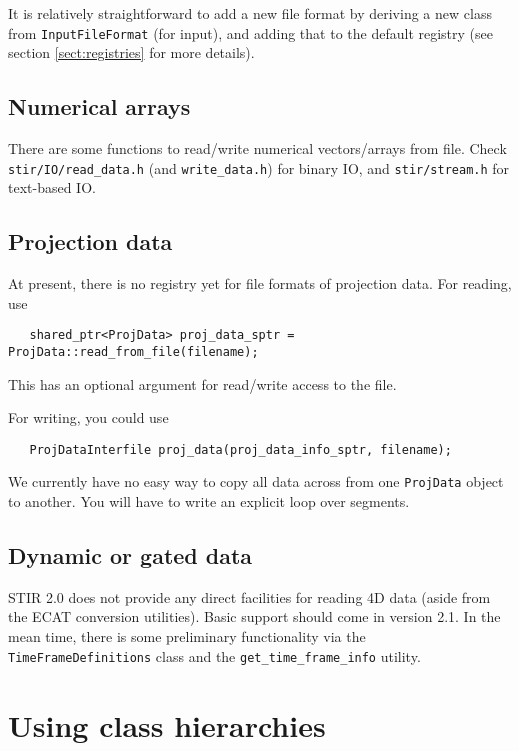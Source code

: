 \documentclass{article}
\begin{document}
It is relatively straightforward to add a new file format by deriving a new class
from \texttt{InputFileFormat} (for input), and adding that to the default registry
(see section \ref{sect:registries} for more details).

\subsection{Numerical arrays}
There are some functions to read/write numerical vectors/arrays from
file. Check \texttt{stir/IO/read\_data.h} (and \texttt{write\_data.h}) for
binary IO, and \texttt{stir/stream.h} for text-based IO.

\subsection{Projection data}
At present, there is no registry yet for file formats of projection data. For reading, use
\begin{verbatim}
   shared_ptr<ProjData> proj_data_sptr = ProjData::read_from_file(filename);
\end{verbatim}
This has an optional argument for read/write access to the file.

For writing, you could use
\begin{verbatim}
   ProjDataInterfile proj_data(proj_data_info_sptr, filename);
\end{verbatim}
We currently have no easy way to copy all data across from one \texttt{ProjData}
object to another. You will have to write an explicit loop over segments.

\subsection{Dynamic or gated data}
STIR 2.0 does not provide any direct facilities for reading 4D data (aside from
the ECAT conversion utilities). Basic support should come in version 2.1.
In the mean time, there is some preliminary functionality via the 
\texttt{TimeFrameDefinitions} class and the \texttt{get\_time\_frame\_info}
utility.


\section{
Using class hierarchies \label{sect:classhierarchies}}
\end{document}

